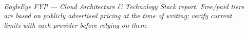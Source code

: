 \documentclass[11pt,a4paper]{article}
\begin{document}
\vspace{1em}
\noindent{\color{rulegray}\rule{\linewidth}{0.4pt}}\\
{\small\itshape\color{eaglegray} EagleEye FYP --- Cloud Architecture \& Technology Stack report.
Free/paid tiers are based on publicly advertised pricing at the time of writing; verify current
limits with each provider before relying on them.}
\end{document}
